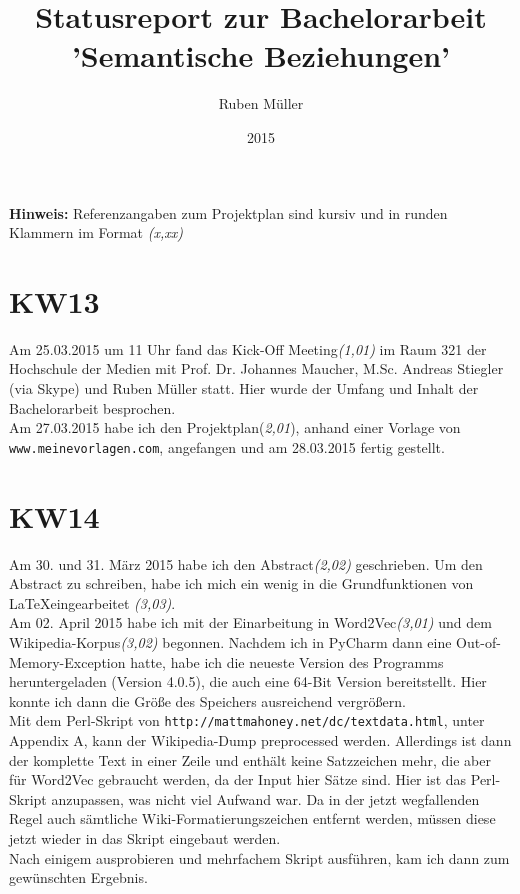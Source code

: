\documentclass[11pt,a4paper]{article}
\begin{document}
\title{Statusreport zur Bachelorarbeit 'Semantische Beziehungen'}
\date{2015}
\author{Ruben Müller}
\maketitle

\textbf{Hinweis:} Referenzangaben zum Projektplan sind kursiv und in runden Klammern im Format \textit{(x,xx)}
\section*{KW13}
Am 25.03.2015 um 11 Uhr fand das Kick-Off Meeting\textit{(1,01)} im Raum 321 der Hochschule der Medien  mit Prof. Dr. Johannes Maucher, M.Sc. Andreas Stiegler (via Skype) und Ruben Müller statt. Hier wurde der Umfang und Inhalt der Bachelorarbeit besprochen.
\\Am 27.03.2015 habe ich den Projektplan(\textit{2,01}), anhand einer Vorlage von \\\texttt{www.meinevorlagen.com}, angefangen und am 28.03.2015 fertig gestellt. 
\section*{KW14}
Am 30. und 31. März 2015 habe ich den Abstract\textit{(2,02)} geschrieben. Um den Abstract zu schreiben, habe ich mich ein wenig in die Grundfunktionen von \LaTeX eingearbeitet \textit{(3,03)}.
\\Am 02. April 2015 habe ich mit der Einarbeitung in Word2Vec\textit{(3,01)} und dem Wikipedia-Korpus\textit{(3,02)} begonnen. Nachdem ich in PyCharm dann eine Out-of-Memory-Exception hatte, habe ich die neueste Version des Programms heruntergeladen (Version 4.0.5), die auch eine 64-Bit Version bereitstellt. Hier konnte ich dann die Größe des Speichers ausreichend vergrößern. 
\\Mit dem Perl-Skript von \texttt{http://mattmahoney.net/dc/textdata.html}, unter Appendix A, kann der Wikipedia-Dump preprocessed werden. Allerdings ist dann der komplette Text in einer Zeile und enthält keine Satzzeichen mehr, die aber für Word2Vec gebraucht werden, da der Input hier Sätze sind. Hier ist das Perl-Skript anzupassen, was nicht viel Aufwand war. Da in der jetzt wegfallenden Regel auch sämtliche Wiki-Formatierungszeichen entfernt werden, müssen diese jetzt wieder in das Skript eingebaut werden.
\\Nach einigem ausprobieren und mehrfachem Skript ausführen, kam ich dann zum gewünschten Ergebnis.
\end{document}
